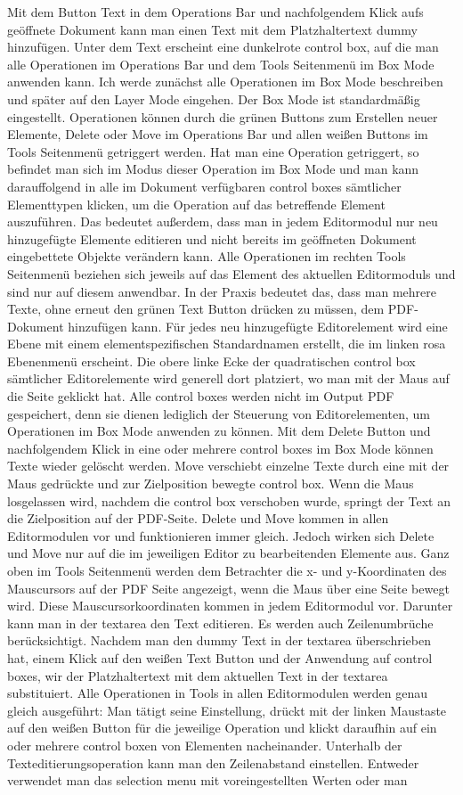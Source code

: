 Mit dem Button Text in dem Operations Bar und nachfolgendem Klick aufs geöffnete Dokument kann man einen Text mit dem Platzhaltertext dummy hinzufügen. Unter dem Text erscheint eine dunkelrote control box, auf die man alle Operationen im Operations Bar und dem Tools Seitenmenü im Box Mode anwenden kann. Ich werde zunächst alle Operationen im Box Mode beschreiben und später auf den Layer Mode eingehen. Der Box Mode ist standardmäßig eingestellt. Operationen können durch die grünen Buttons zum Erstellen neuer Elemente, Delete oder Move im Operations Bar und allen weißen Buttons im Tools Seitenmenü getriggert werden. Hat man eine Operation getriggert, so befindet man sich im Modus dieser Operation im Box Mode und man kann darauffolgend in alle im Dokument verfügbaren control boxes sämtlicher Elementtypen klicken, um die Operation auf das betreffende Element auszuführen. Das bedeutet außerdem, dass man in jedem Editormodul nur neu hinzugefügte Elemente editieren und nicht bereits im geöffneten Dokument eingebettete Objekte verändern kann. Alle Operationen im rechten Tools Seitenmenü beziehen sich jeweils auf das Element des aktuellen Editormoduls und sind nur auf diesem anwendbar. In der Praxis bedeutet das, dass man mehrere Texte, ohne erneut den grünen Text Button drücken zu müssen, dem PDF-Dokument hinzufügen kann. Für jedes neu hinzugefügte Editorelement wird eine Ebene mit einem elementspezifischen Standardnamen erstellt, die im linken rosa Ebenenmenü erscheint. Die obere linke Ecke der quadratischen control box sämtlicher Editorelemente wird generell dort platziert, wo man mit der Maus auf die Seite geklickt hat. Alle control boxes werden nicht im  Output PDF gespeichert, denn sie dienen lediglich der Steuerung von Editorelementen, um Operationen im Box Mode anwenden zu können. Mit dem Delete Button und nachfolgendem Klick in eine oder mehrere control boxes im Box Mode können Texte wieder gelöscht werden. Move verschiebt einzelne Texte durch eine mit der Maus gedrückte und zur Zielposition bewegte control box. Wenn die Maus losgelassen wird, nachdem die control box verschoben wurde, springt der Text an die Zielposition auf der PDF-Seite. Delete und Move kommen in allen Editormodulen vor und funktionieren immer gleich. Jedoch wirken sich Delete und Move nur auf die im jeweiligen Editor zu bearbeitenden Elemente aus. Ganz oben im Tools Seitenmenü werden dem Betrachter die x- und y-Koordinaten des Mauscursors auf der PDF Seite angezeigt, wenn die Maus über eine Seite bewegt wird. Diese Mauscursorkoordinaten kommen in jedem Editormodul vor. Darunter kann man in der textarea den Text editieren. Es werden auch Zeilenumbrüche berücksichtigt. Nachdem man den dummy Text in der textarea überschrieben hat, einem Klick auf den weißen Text Button und der Anwendung auf control boxes, wir der Platzhaltertext mit dem aktuellen Text in der textarea substituiert. Alle Operationen in Tools in allen Editormodulen werden genau gleich ausgeführt: Man tätigt seine Einstellung, drückt mit der linken Maustaste auf den weißen Button für die jeweilige Operation und klickt daraufhin auf ein oder mehrere control boxen von Elementen nacheinander. Unterhalb der Texteditierungsoperation kann man den Zeilenabstand einstellen. Entweder verwendet man das selection menu mit voreingestellten Werten oder man 